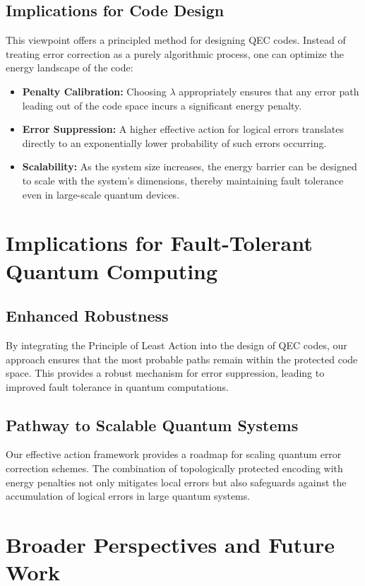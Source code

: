 \documentclass[12pt]{article}
\begin{document}
\subsection{Implications for Code Design}
This viewpoint offers a principled method for designing QEC codes. Instead of treating error correction as a purely algorithmic process, one can optimize the energy landscape of the code:
\begin{itemize}[label=\textbullet]
    \item \textbf{Penalty Calibration:} Choosing \( \lambda \) appropriately ensures that any error path leading out of the code space incurs a significant energy penalty.
    \item \textbf{Error Suppression:} A higher effective action for logical errors translates directly to an exponentially lower probability of such errors occurring.
    \item \textbf{Scalability:} As the system size increases, the energy barrier can be designed to scale with the system’s dimensions, thereby maintaining fault tolerance even in large-scale quantum devices.
\end{itemize}

\section{Implications for Fault-Tolerant Quantum Computing}
\subsection{Enhanced Robustness}
By integrating the Principle of Least Action into the design of QEC codes, our approach ensures that the most probable paths remain within the protected code space. This provides a robust mechanism for error suppression, leading to improved fault tolerance in quantum computations.

\subsection{Pathway to Scalable Quantum Systems}
Our effective action framework provides a roadmap for scaling quantum error correction schemes. The combination of topologically protected encoding with energy penalties not only mitigates local errors but also safeguards against the accumulation of logical errors in large quantum systems.

\section{Broader Perspectives and Future Work}
\end{document}
